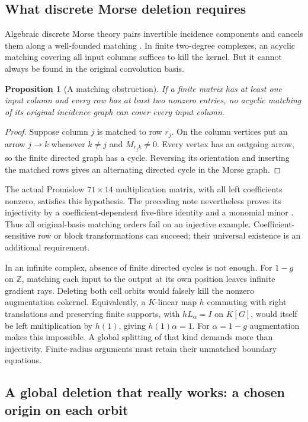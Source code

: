\documentclass[11pt,a4paper,oneside]{report}
\newtheorem{proposition}[theorem]{Proposition}
\theoremstyle{definition}
\theoremstyle{remark}
\newcommand{\Z}{\mathbb Z}
\begin{document}
\subsection{What discrete Morse deletion requires}

Algebraic discrete Morse theory pairs invertible incidence
components and cancels them along a well-founded matching
\cite{B:Skoldberg}. In finite two-degree complexes, an acyclic
matching covering all input columns suffices to kill the
kernel. But it cannot always be found in the original
convolution basis.

\begin{proposition}[A matching obstruction]\label{M07:prop:morse}
If a finite matrix has at least one input column and every row has at least two nonzero
entries, no acyclic matching of its original incidence
graph can cover every input column.
\end{proposition}
\begin{proof}
Suppose column $j$ is matched to row $r_j$. On the column
vertices put an arrow $j\to k$ whenever $k\ne j$ and
$M_{r_jk}\ne0$. Every vertex has an outgoing arrow, so
the finite directed graph has a cycle. Reversing its
orientation and inserting the matched rows gives an
alternating directed cycle in the Morse graph.
\end{proof}

The actual Promislow $71\times14$ multiplication matrix,
with all left coefficients nonzero, satisfies this
hypothesis. The preceding note nevertheless proves its
injectivity by a coefficient-dependent five-fibre
identity and a monomial minor \cite{B:InternalResidual}.
Thus all original-basis matching orders fail on an
injective example. Coefficient-sensitive row or block
transformations can succeed; their universal existence
is an additional requirement.

In an infinite complex, absence of finite directed cycles
is not enough. For $1-g$ on $\Z$, matching each input
to the output at its own position leaves infinite
gradient rays. Deleting both cell orbits would falsely
kill the nonzero augmentation cokernel.
Equivalently, a $K$-linear map $h$ commuting with right translations
and preserving finite supports, with $hL_\alpha=I$ on $K[G]$, would itself be
left multiplication by $h(1)$, giving $h(1)\alpha=1$.
For $\alpha=1-g$ augmentation makes this impossible.
A global splitting of that kind demands more than
injectivity. Finite-radius arguments must retain their
unmatched boundary equations.

\subsection{A global deletion that really works: a chosen origin on each orbit}
\end{document}
